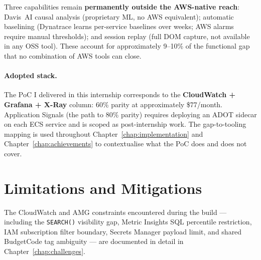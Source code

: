 \noindent
Three capabilities remain \textbf{permanently outside the AWS-native reach}:
Davis~AI causal analysis (proprietary ML, no AWS equivalent); automatic
baselining (Dynatrace learns per-service baselines over weeks; AWS alarms
require manual thresholds); and session replay (full DOM capture, not
available in any OSS tool). These account for approximately 9--10\% of
the functional gap that no combination of AWS tools can close.

\paragraph{Adopted stack.}
The PoC I delivered in this internship corresponds to the
\textbf{CloudWatch + Grafana + X-Ray} column: 60\% parity at approximately
\$77/month. Application Signals (the path to 80\% parity) requires deploying
an ADOT sidecar on each ECS service and is scoped as post-internship work.
The gap-to-tooling mapping is used throughout Chapter~\ref{chap:implementation}
and Chapter~\ref{chap:achievements} to contextualise what the PoC does and does
not cover.

\section{Limitations and Mitigations}
\label{sec:limitations}

The CloudWatch and AMG constraints encountered during the build ---
including the \texttt{SEARCH()} visibility gap, Metric Insights SQL
percentile restriction, IAM subscription filter boundary, Secrets Manager
payload limit, and shared BudgetCode tag ambiguity --- are documented in
detail in Chapter~\ref{chap:challenges}.